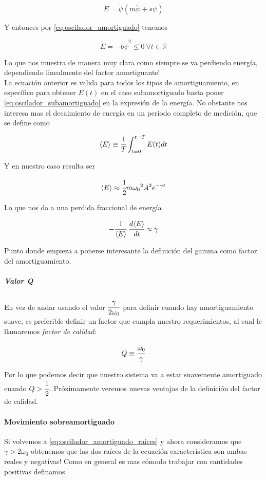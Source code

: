 \documentclass[a4paper,spanish]{article}
\def\R {\mathbb{R}}
\numberwithin{equation}{section}
\begin{document}
\[\dot{E}=\dot{\psi}\left(m\ddot{\psi}+s\psi\right)\]

Y entonces por \ref{eq:oscilador_amortiguado} tenemos

\begin{equation}
  \dot{E}=-b\dot{\psi}^2\leq0\ \forall{t} \in \R 
\end{equation}

Lo que nos muestra de manera muy clara como siempre se va perdiendo energ\'ia, dependiendo linealmente del factor amortiguante!\\
La ecuaci\'on anterior es valida para todos los tipos de amortiguamiento, en espec\'ifico para obtener $E(t)$ en el caso subamortiguado basta poner \ref{eq:oscilador_subamortiguado} en la expresi\'on de la energ\'ia. No obstante nos interesa mas el decaimiento de energ\'ia en un periodo completo de medici\'on, que se define como

\begin{equation}
\langle{E}\rangle \equiv \cfrac{1}{T} \int _{t=0} ^{t=T} E(t) dt
\label{promedio_temporal}
\end{equation}

Y en nuestro caso resulta ser

\begin{equation}
\langle{E}\rangle \approx \cfrac{1}{2} m {\omega_0}^2 A^2 e^{-\gamma t}
\end{equation} 

Lo que nos da a una perdida fraccional de energ\'ia

\begin{equation}
-\cfrac{1}{\langle{E}\rangle}.\cfrac{d\langle{E}\rangle}{dt} \approx \gamma
\label{perdida_proporcional_energia_oscilador}
\end{equation}

Punto donde empieza a ponerse interesante la definici\'on del gamma como factor del amortiguamiento.

\subparagraph*{Valor Q}
En vez de andar usando el valor $\cfrac{\gamma}{2\omega_0}$ para definir cuando hay amortiguamiento suave, es preferible definir un factor que cumpla nuestro requerimientos, al cual le llamaremos \textit{factor de calidad}:

\[Q\equiv\cfrac{\omega_0}{\gamma}\]

Por lo que podemos decir que nuestro sistema va a estar suavemente amortiguado cuando $Q>\cfrac{1}{2}$. Pr\'oximamente veremos nuevas ventajas de la definici\'on del factor de calidad.

\paragraph{Movimiento sobreamortiguado}
Si volvemos a \ref{eq:oscilador_amortiguado_raices} y ahora consideramos que $\gamma>2\omega_0$ obtenemos que las dos ra\'ices de la ecuaci\'on caracter\'istica son ambas reales y negativas! Como en general es mas c\'omodo trabajar con cantidades positivas definamos
\end{document}
